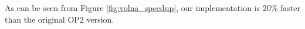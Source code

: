 As can be seen from Figure \ref{fig:volna_speedup}, our implementation is 20\%
faster than the original OP2 version.

